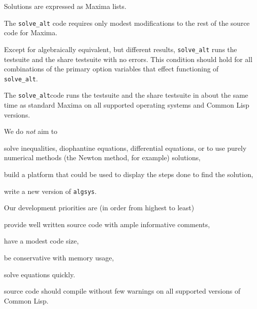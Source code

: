\documentclass[]{scrartcl}
\newcommand{\altsolve}{\texttt{solve\_alt}}
\newcommand{\algsys}{\texttt{algsys}}
\begin{document}
\begin{alphalist}[noitemsep]

\item  Solutions are expressed as Maxima lists.

 \item The \altsolve\/ code requires only modest modifications to the rest of the source code for  Maxima.

\item Except for algebraically equivalent, but different results, \altsolve\/  runs the testsuite and the share testsuite with no errors. This condition should hold for all combinations of the primary option variables that effect functioning of \altsolve.

\item  The \altsolve code runs the testsuite and the share testsuite in about the same time as standard Maxima on all supported operating systems and Common Lisp versions.

\end{alphalist}
We do \emph{not} aim to
\begin{alphalist}[noitemsep]

\item solve inequalities, diophantine equations, differential equations, or to use purely numerical methods (the Newton method, for example) solutions,

\item build a platform that could be used to display the steps done to find the solution,

\item write a new version of \algsys.

\end{alphalist}
Our development priorities are (in order from highest to least)

\begin{alphalist}[noitemsep]

\item  provide well written source code with ample informative comments,

\item  have  a modest code size,

\item be conservative with memory usage,

\item solve equations quickly.

\item source code should compile without few warnings on all supported versions of Common Lisp.
\end{alphalist}
\end{document}
